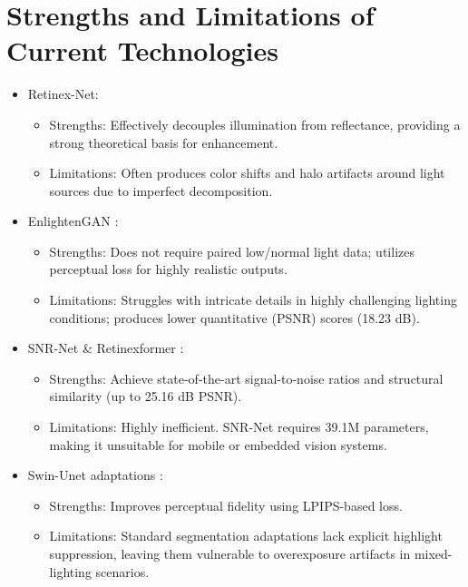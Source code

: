 \documentclass[12pt, a4paper]{report}
\begin{document}
\section{Strengths and Limitations of Current Technologies}
\begin{itemize}
    \item Retinex-Net:
        \begin{itemize}
            \item Strengths: Effectively decouples illumination from reflectance, providing a strong theoretical basis for enhancement.
            \item Limitations: Often produces color shifts and halo artifacts around light sources due to imperfect decomposition.
        \end{itemize}
    \item EnlightenGAN \cite{jiang2021enlightengan}:
        \begin{itemize}
            \item Strengths: Does not require paired low/normal light data; utilizes perceptual loss for highly realistic outputs.
            \item Limitations: Struggles with intricate details in highly challenging lighting conditions; produces lower quantitative (PSNR) scores (18.23 dB).
        \end{itemize}
    \item SNR-Net \cite{xu2022snrnet} \& Retinexformer \cite{cai2023retinexformer}:
        \begin{itemize}
            \item Strengths: Achieve state-of-the-art signal-to-noise ratios and structural similarity (up to 25.16 dB PSNR).
            \item Limitations: Highly inefficient. SNR-Net requires 39.1M parameters, making it unsuitable for mobile or embedded vision systems.
        \end{itemize}
    \item Swin-Unet adaptations \cite{lehmann2025perceptually}:
        \begin{itemize}
            \item Strengths: Improves perceptual fidelity using LPIPS-based loss.
            \item Limitations: Standard segmentation adaptations lack explicit highlight suppression, leaving them vulnerable to overexposure artifacts in mixed-lighting scenarios.
        \end{itemize}
\end{itemize}
\end{document}

